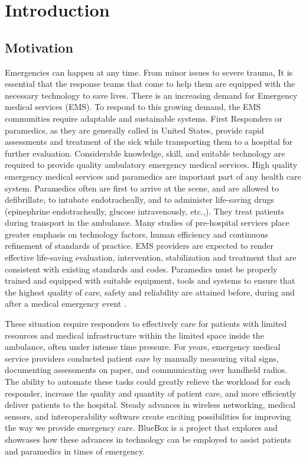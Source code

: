 \chapter{Introduction}
\section{Motivation}
Emergencies can happen at any time. From minor issues to severe trauma, It is essential that the response teams that come to help them are equipped with the necessary technology to save lives. There is an increasing demand for Emergency medical services (EMS). To respond to this growing demand, the EMS communities require adaptable and sustainable systems. First Responders or paramedics, as they are generally called in United States, provide rapid assessments and treatment of the sick while transporting them to a hospital for further evaluation. Considerable knowledge, skill, and suitable technology are required to provide quality ambulatory emergency medical services. High quality emergency medical services and paramedics are important part of any health care system. Paramedics often are first to arrive at the scene, and are allowed to defibrillate, to intubate endotracheally, and to administer life-saving drugs (epinephrine endotracheally, glucose intravenously, etc.,). They treat patients during transport in the ambulance. Many studies of pre-hospital services place greater emphasis on technology factors, human efficiency and continuous refinement of standards of practice. EMS providers are expected to render effective life-saving evaluation, intervention, stabilization and treatment that are consistent with existing standards and codes. Paramedics must be properly trained and equipped with suitable equipment, tools and systems to ensure that the highest quality of care, safety and reliability are attained before, during and after a medical emergency event \cite{EMS, EMS1, EMS2, EMS3}.

\hspace{10mm} These situation require responders to effectively care for patients with limited resources and medical infrastructure within the limited space inside the ambulance, often under intense time pressure. For years, emergency medical service providers conducted patient care by manually measuring vital signs, documenting assessments on paper, and communicating over handheld radios. The ability to automate these tasks could greatly relieve the workload for each responder, increase the quality and quantity of patient care, and more efficiently deliver patients to the hospital. 
Steady advances in wireless networking, medical sensors, and interoperability software create exciting possibilities for improving the way we provide emergency care. BlueBox is a project that explores and showcases how these advances in technology can be employed to assist patients and paramedics in times of emergency. 

